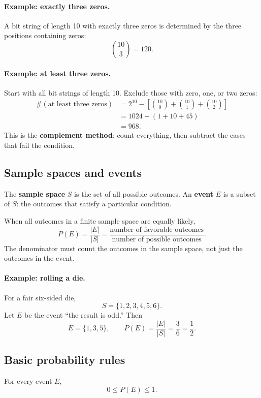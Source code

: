 \documentclass[11pt]{article}
\begin{document}
\paragraph{Example: exactly three zeros.}
A bit string of length 10 with exactly three zeros is determined by
the three positions containing zeros:
\[
\binom{10}{3}=120.
\]

\paragraph{Example: at least three zeros.}
Start with all bit strings of length 10. Exclude those with zero,
one, or two zeros:
\[
\begin{aligned}
\#(\text{at least three zeros})
&=2^{10}
 -\left[\binom{10}{0}+\binom{10}{1}+\binom{10}{2}\right]\\
&=1024-(1+10+45)\\
&=\boxed{968}.
\end{aligned}
\]
This is the \textbf{complement method}: count everything, then
subtract the cases that fail the condition.

\subsection{Sample spaces and events}

The \textbf{sample space} $S$ is the set of all possible outcomes.
An \textbf{event} $E$ is a subset of $S$: the outcomes that satisfy
a particular condition.

When all outcomes in a finite sample space are equally likely,
\[
P(E)=\frac{|E|}{|S|}
=\frac{\text{number of favorable outcomes}}
       {\text{number of possible outcomes}}.
\]
The denominator must count the outcomes in the sample space, not
just the outcomes in the event.

\paragraph{Example: rolling a die.}
For a fair six-sided die,
\[
S=\{1,2,3,4,5,6\}.
\]
Let $E$ be the event ``the result is odd.'' Then
\[
E=\{1,3,5\},
\qquad
P(E)=\frac{|E|}{|S|}=\frac{3}{6}=\frac12.
\]

\subsection{Basic probability rules}

For every event $E$,
\[
0\leq P(E)\leq 1.
\]
\end{document}
